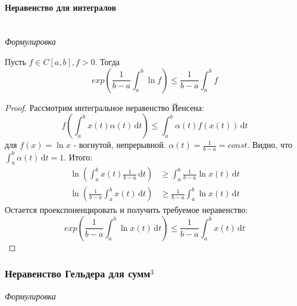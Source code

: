 \documentclass{article}
\def\D{\,\mathrm{d}}
\let\vanillaparagraph\paragraph
\renewcommand{\paragraph}[1]{\vanillaparagraph{#1}\mbox{}\\}
\begin{document}
\paragraph{Неравенство для интегралов}
\textit{Формулировка}

Пусть $f \in C[a, b], f > 0$. Тогда 
\begin{equation*}
exp\left(\frac{1} {b - a} \int_a^b \ln{f}\right) \leq \frac{1} {b - a} \int_a^b f
\end{equation*}
\begin{proof}
Рассмотрим интегральное неравенство Йенсена:
\begin{equation*}
f(\int_a^b x(t) \alpha(t) \D t) \le \int_a^b \alpha(t) f(x(t)) \D t
\end{equation*}
для $f(x) = \ln{x}$ - вогнутой, непрерывной. $\alpha(t) = \frac{1} {b - a} = const$. Видно, что $\int_a^b \alpha(t) \D t = 1$. Итого:
\begin{align*}
\ln{\left(\int_a^b x(t) \frac{1} {b - a} \D t\right)} &\geq \int_a^b \frac{1} {b - a} \ln{x(t)} \D t\\
\ln{\left(\frac{1} {b - a} \int_a^b x(t)\D t\right)} &\geq\frac {1}{b - a} \int_a^b \ln{x(t)} \D t
\end{align*}
Остается проекспоненцировать и получить требуемое неравенство:
\begin{equation*}
exp\left(\frac{1} {b - a} \int_a^b \ln{x(t)} \D t\right) \leq \frac{1} {b - a} \int_a^b x(t) \D t
\end{equation*}
\end{proof}

\subsubsection{Неравенство Гельдера для сумм\texorpdfstring{$^3$}{}}
\textit{Формулировка}
\end{document}
